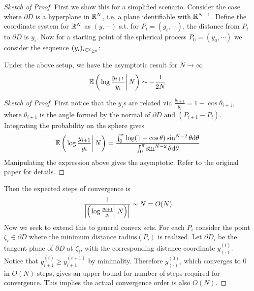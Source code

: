\documentclass[10pt]{article}
\begin{document}
\begin{proof}[Sketch of Proof]
    First we show this for a simplified scenario. Consider the case where $\partial D$ is a hyperplane in $\mathbb{R}^N$, i.e. a plane identifiable with $\mathbb{R}^{N - 1}$. Define the coordinate system for $\mathbb{R}^N$ as $(y, \cdots)$ s.t. for $P_i = (y_i, \cdots)$, the distance from $P_i$ to $\partial D$ is $y_i$. Now for a starting point of the spherical process $P_0 = (y_0, \cdots)$ we consider the sequence $(y_i)_{i \in \mathbb{Z}_{\geq 0}}$:

    \begin{paraindent}
        \begin{lemma}
            Under the above setup, we have the asymptotic result for $N \to \infty$
            \[
                \mathbb{E}\left( \left. \log \frac{y_{i+1}}{y_i} \right| N \right) \sim -\frac{1}{2N}
            \]
        \end{lemma}

        \begin{proof}[Sketch of Proof]
            First notice that the $y_{i}$s are related via $\frac{y_{i+1}}{y_i} = 1 - \cos \theta_{i+1}$, where $\theta_{i+1}$ is the angle formed by the normal of $\partial D$ and $(P_{i+1} - P_i)$. Integrating the probability on the sphere gives
            \[
                \mathbb{E}\left( \left. \log \frac{y_{i+1}}{y_i} \right| N \right) = \frac{\int_{0}^{\pi} \log (1 - \cos \theta) \sin^{N-2} \theta \mathrm{d} \theta}{\int_0^{\pi} \sin^{N-2} \theta \mathrm{d} \theta}
            \]
            Manipulating the expression above gives the asymptotic. Refer to the original paper for details.
        \end{proof}
    \end{paraindent}

    Then the expected steps of convergence is 
    \[
        \frac{1}{ \left|\left( \left. \log \frac{y_{i+1}}{y_i} \right| N \right)\right|} \sim N = O(N) 
    \]
    Now we seek to extend this to general convex sets. For each $P_i$ consider the point $\zeta_i \in \partial D$ where the minimum distance $\text{radius}(P_i)$ is realized. Let $\partial D_i$ be the tangent plane of $\partial D$ at $\zeta_i$, with the corresponding distance coordinate $y_{(\cdot)}^{(i)}$. Notice that $y_{i+1}^{(i)} \geq y_{i+1}^{(i+1)}$ by minimality. Therefore $y_{(\cdot)}^{(0)}$, which converges to 0 in $O(N)$ steps, gives an upper bound for number of steps required for convergence. This implies the actual convergence order is also $O(N)$. 
\end{proof}
\end{document}
